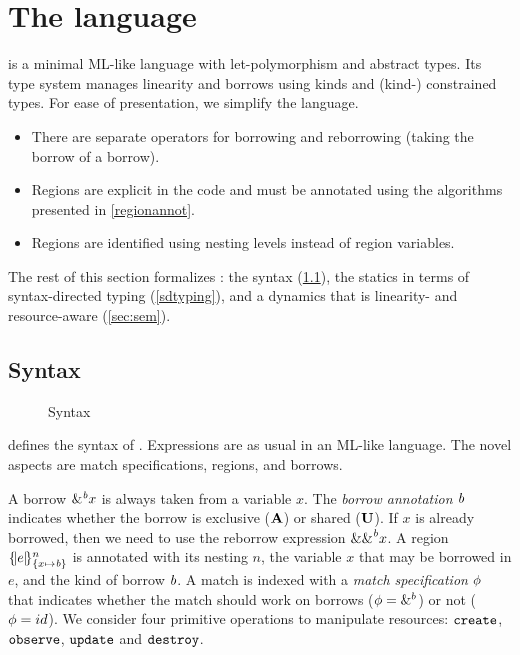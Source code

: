 \section{The \lang language}

\lang is a minimal ML-like language with
let-polymorphism and abstract types. Its type system manages
linearity and borrows using kinds and (kind-) constrained types.
For ease of presentation, we simplify the language.
\begin{itemize}
\item There are separate operators for borrowing and reborrowing (taking
  the borrow of a borrow).
\item Regions are explicit in the code and must be annotated using the
  algorithms presented in \cref{regionannot}.
\item Regions are identified using nesting levels instead of region
  variables.
\end{itemize}

The rest of this section formalizes  \lang: the syntax (\cref{syntax}),
the statics in terms of syntax-directed typing (\cref{sdtyping}),
and a dynamics that is linearity- and resource-aware (\cref{sec:sem}).

\subsection{Syntax}
\label{syntax}

\begin{figure}[!tb]
  
  \vspace{-5pt}
  \caption{Syntax}
  \label{grammar}
  \vspace{-10pt}
\end{figure}


 defines the syntax of \lang. Expressions are as usual
in an ML-like language.  The novel aspects are match
specifications, regions, and borrows.

A borrow $\borrow{x}$ is always taken from a variable $x$. The
\emph{borrow annotation} $\BORROW$ indicates whether the borrow is exclusive
($\MBORROW$) or shared ($\IBORROW$). If $x$ is already borrowed,
then we need to use the reborrow expression $\reborrow{x}$.
%
A region $\region{\Sone x\BORROW}{e}$ is annotated with its nesting $n$, the variable $x$ that may be borrowed in $e$, and the kind of borrow $\BORROW$.
%
A match is indexed with a \emph{match specification} $\etransfm$ that indicates
whether the match should work on borrows ($\etransfm=\&^b$) or not ($\etransfm=id$).
%
We consider four primitive operations to manipulate resources:
$\create$, $\observe$, $\update$ and $\destroy$.

